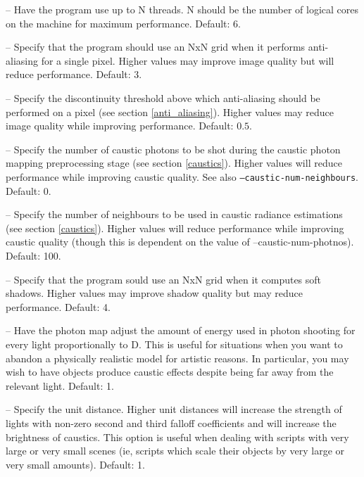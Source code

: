 \documentclass{article}
\begin{document}
\begin{itemize}

   -- Have the program use up to N threads. N should be
  the number of logical cores on the machine for maximum performance. Default:
  6.

   -- Specify that the program should use an NxN grid when
  it performs anti-aliasing for a single pixel. Higher values may improve image
  quality but will reduce performance. Default: 3.

   -- Specify the discontinuity threshold above which
  anti-aliasing should be performed on a pixel (see section
  \ref{anti_aliasing}). Higher values may reduce image quality while improving
  performance. Default: $0.5$.

   -- Specify the number of caustic photons to be
  shot during the caustic photon mapping preprocessing stage (see section
  \ref{caustics}). Higher values will reduce performance while improving caustic
quality. See also {\tt --caustic-num-neighbours}. Default: 0.

   -- Specify the number of neighbours to be
  used in caustic radiance estimations (see section \ref{caustics}). Higher
  values will reduce performance while improving caustic quality (though this is
  dependent on the value of --caustic-num-photnos). Default: 100.

   -- Specify that the program sould use an NxN grid when
  it computes soft shadows. Higher values may improve shadow quality but may
  reduce performance. Default: 4.

   -- Have the photon map adjust the amount of energy
  used in photon shooting for every light proportionally to D. This is useful
  for situations when you want to abandon a physically realistic model for
  artistic reasons. In particular, you may wish to have objects produce caustic
  effects despite being far away from the relevant light. Default: 1.

   -- Specify the unit distance. Higher unit distances
  will increase the strength of lights with non-zero second and third falloff
  coefficients and will increase the brightness of caustics. This option is
  useful when dealing with scripts with very large or very small scenes (ie,
  scripts which scale their objects by very large or very small amounts).
  Default: 1.


\end{itemize}
\end{document}
